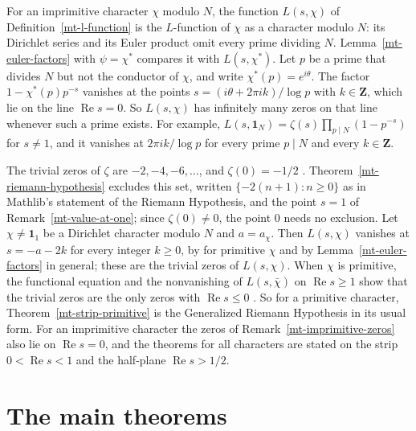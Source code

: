 \begin{remark}\label{mt-imprimitive-zeros}
For an imprimitive character $\chi$ modulo $N$, the function $L(s,\chi)$ of
Definition~\ref{mt-l-function} is the $L$-function of $\chi$ as a character modulo $N$: its
Dirichlet series and its Euler product omit every prime dividing $N$. Lemma~\ref{mt-euler-factors}
with $\psi=\chi^*$ compares it with $L(s,\chi^*)$. Let $p$ be a prime that divides $N$ but not
the conductor of $\chi$, and write $\chi^*(p)=e^{i\theta}$. The factor $1-\chi^*(p)p^{-s}$ vanishes at
the points $s=(i\theta+2\pi ik)/\log p$ with $k\in\mathbf Z$, which lie on the line
$\operatorname{Re}s=0$. So $L(s,\chi)$ has infinitely many zeros on that line whenever such a prime exists. For example,
$L(s,\mathbf 1_N)=\zeta(s)\prod_{p\mid N}(1-p^{-s})$ for $s\neq1$, and it vanishes at $2\pi ik/\log p$
for every prime $p\mid N$ and every $k\in\mathbf Z$.
\end{remark}

\begin{remark}\label{mt-trivial-zeros}
The trivial zeros of $\zeta$ are $-2,-4,-6,\ldots$, and $\zeta(0)=-1/2$ \cite[Chapter 2]{Tit86}.
Theorem~\ref{mt-riemann-hypothesis} excludes this set, written $\{-2(n+1):n\geq0\}$ as in Mathlib's
statement of the Riemann Hypothesis, and the point $s=1$ of Remark~\ref{mt-value-at-one}; since
$\zeta(0)\neq0$, the point $0$ needs no exclusion. Let $\chi\neq\mathbf 1_1$ be a Dirichlet character
modulo $N$ and $a=a_\chi$. Then $L(s,\chi)$ vanishes at $s=-a-2k$ for every integer $k\geq0$, by
\cite[Chapter 9]{Dav00} for primitive $\chi$ and by Lemma~\ref{mt-euler-factors} in general; these
are the trivial zeros of $L(s,\chi)$. When $\chi$ is primitive,
the functional equation and the nonvanishing of $L(s,\bar\chi)$ on $\operatorname{Re}s\geq1$ show
that the trivial zeros are the only zeros with $\operatorname{Re}s\leq0$
\cite[Chapters 9 and 14]{Dav00}. So for a primitive character, Theorem~\ref{mt-strip-primitive} is
the Generalized Riemann Hypothesis in its usual form. For an imprimitive character the zeros of
Remark~\ref{mt-imprimitive-zeros} also lie on $\operatorname{Re}s=0$, and the theorems for all
characters are stated on the strip $0<\operatorname{Re}s<1$ and the half-plane
$\operatorname{Re}s>1/2$.
\end{remark}

\section{The main theorems}\label{section-mt-main-theorems}

